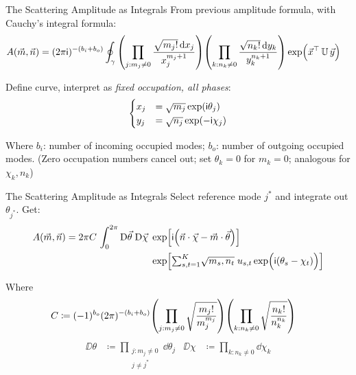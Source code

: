 \begin{frame}{The Scattering Amplitude as Integrals}
%
From previous amplitude formula, with Cauchy's integral formula:
\begin{align*}
	A(\vec{m}, \vec{n})
&=
	(2\pi\mathsf{i})^{-(b_i + b_o)}
	\oint_{\gamma}
		\qty( \prod_{j : m_j \neq 0}
			\frac
				{\sqrt{m_j!} \dd{x_j}}
				{x_j^{m_j+1}}
		)
		\qty( \prod_{k : n_k \neq 0}
			\frac
				{\sqrt{n_k!} \dd{y_k}}
				{ y_k^{n_k+1} }
		)
		\exp( \Big. \vec{x}^\top \, \mathbb{U} \, \vec{y})
\end{align*}

Define curve, interpret as \emph{fixed occupation, all phases}:
\begin{align*}
	\begin{cases}
	x_j &= \sqrt{m_j} \exp( \mathsf{i} \theta_j) \\
	y_j &= \sqrt{n_j} \exp(-\mathsf{i} \chi  _j)
	\end{cases}
\end{align*}

Where $b_i$: number of incoming occupied modes; $b_o$: number of outgoing occupied modes.
(Zero occupation numbers cancel out; set $\theta_k = 0$ for $m_k = 0$; analogous for $\chi_k, n_k$)
%
\end{frame}


\begin{frame}{The Scattering Amplitude as Integrals}
%
Select reference mode $j^*$ and integrate out $\theta_{j^*}$. Get:
\begin{align*}
	A(\vec{m}, \vec{n})
=
	2\pi C \,
	\int_{0}^{2\pi}
		\text{D}\vec{\theta}\; \text{D}\vec{\chi}\;
	&\exp[
		\mathsf{i} \qty(
			\vec{n} \cdot \vec{\chi}
			-
			\vec{m} \cdot \vec{\theta}
		)]
\\
	&\exp[
		{\textstyle \sum_{s,t=1}^{K} }
			\sqrt{m_s, n_t} \;
			u_{s,t}
			\exp(\Big. \mathsf{i}(\theta_s - \chi_t) )
	]
\end{align*}

Where
\begin{align*}
	C
&\coloneqq
	(-1)^{b_o}
	(2\pi)^{-(b_i + b_o)}
	\qty( \prod_{j : m_j \neq 0}
		\sqrt{\frac
			{ m_j! }
			{ m_j^{m_j} }
		}
	)
	\qty( \prod_{k : n_k \neq 0}
		\sqrt{\frac
			{ n_k! }
			{ n_k^{n_k} }
		}
	)
\end{align*}
\begin{align*}
	\DD{\theta}
&\coloneqq
	\prod_{\substack{j : m_j \neq 0 \\ j \neq j^*}}
		\dd{\theta_j}
&
	\DD{\chi}
&\coloneqq
	\prod_{k : n_k \neq 0}
		\dd{\chi  _k}
\end{align*}
%
\end{frame}

